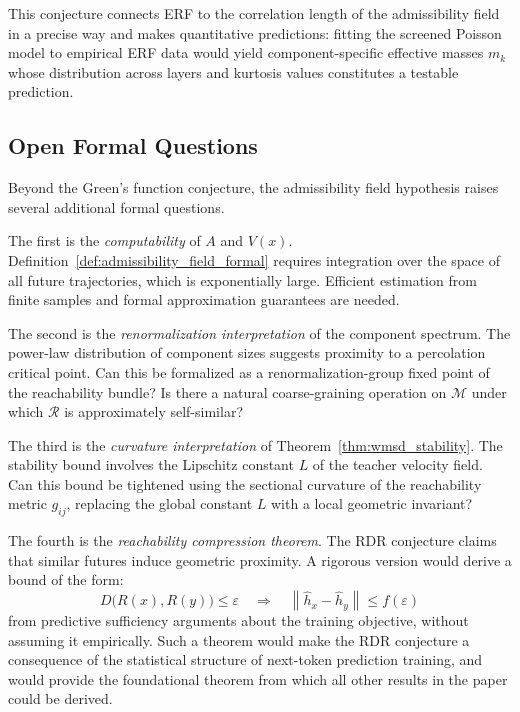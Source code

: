 \documentclass[12pt, a4paper]{article}
\theoremstyle{plain}
\theoremstyle{definition}
\theoremstyle{remark}
\newcommand{\cM}{\mathcal{M}}
\newcommand{\fA}{A}
\newcommand{\norm}[1]{\left\|#1\right\|}
\newcommand{\hh}{\hat{h}}
\newcommand{\Ra}{\Rightarrow}
\begin{document}
This conjecture connects ERF to the correlation length of the admissibility
field in a precise way and makes quantitative predictions: fitting the screened
Poisson model to empirical ERF data would yield component-specific effective
masses $m_k$ whose distribution across layers and kurtosis values constitutes
a testable prediction.

\subsection{Open Formal Questions}

Beyond the Green's function conjecture, the admissibility field hypothesis
raises several additional formal questions.

The first is the \emph{computability} of $\fA$ and $V(x)$.
Definition~\ref{def:admissibility_field_formal} requires integration over the
space of all future trajectories, which is exponentially large. Efficient
estimation from finite samples and formal approximation guarantees are needed.

The second is the \emph{renormalization interpretation} of the component
spectrum. The power-law distribution of component sizes suggests proximity
to a percolation critical point. Can this be formalized as a
renormalization-group fixed point of the reachability bundle? Is there a
natural coarse-graining operation on $\cM$ under which $\mathcal{R}$ is
approximately self-similar?

The third is the \emph{curvature interpretation} of
Theorem~\ref{thm:wmsd_stability}. The stability bound involves the Lipschitz
constant $L$ of the teacher velocity field. Can this bound be tightened using
the sectional curvature of the reachability metric $g_{ij}$, replacing the
global constant $L$ with a local geometric invariant?

The fourth is the \emph{reachability compression theorem}. The RDR conjecture
claims that similar futures induce geometric proximity. A rigorous version would
derive a bound of the form:
\begin{equation}
  D\bigl(R(x), R(y)\bigr) \leq \varepsilon
  \quad\Ra\quad
  \norm{\hh_x - \hh_y} \leq f(\varepsilon)
\end{equation}
from predictive sufficiency arguments about the training objective, without
assuming it empirically. Such a theorem would make the RDR conjecture a
consequence of the statistical structure of next-token prediction training,
and would provide the foundational theorem from which all other results in
the paper could be derived.
\end{document}
